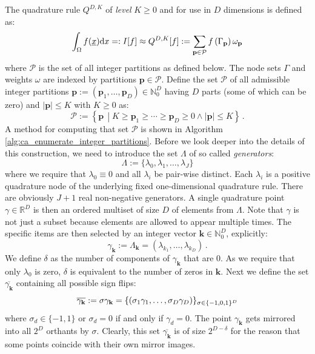 \documentclass[a4paper,10pt]{article}
\begin{document}
The quadrature rule $Q^{D,K}$ of \emph{level} $K \geq 0$ and
for use in $D$ dimensions is defined as:
\begin{equation} \label{eq:gk_basic_formula}
  \int_\Omega f(\underline{x}) \mathrm{d}x =:
  I[f] \approx Q^{D,K}[f]
       := \sum_{\mathbf{p} \in \mathcal{P}}
            f\left(\Gamma_{\mathbf{p}}\right)
            \omega_{\mathbf{p}}
\end{equation}
where $\mathcal{P}$ is the set of all integer partitions as defined below.
The node sets $\Gamma$ and weights $\omega$ are indexed by partitions
$\mathbf{p} \in \mathcal{P}$.
Define the set $\mathcal{P}$ of all admissible integer partitions
$\mathbf{p} := (\mathbf{p}_{1}, \ldots, \mathbf{p}_{D}) \in \mathbb{N}_{0}^{D}$
having $D$ parts (some of which can be zero) and $|\mathbf{p}| \leq K$
with $K \geq 0$ as:
\begin{equation} \label{eq:partition_set_def}
  \mathcal{P} :=
  \left\{
    \mathbf{p} \,
    \middle| K \geq \mathbf{p}_{1} \geq \cdots \geq \mathbf{p}_{D} \geq 0
    \wedge
    |\mathbf{p}| \leq K
  \right\}
  \,.
\end{equation}
A method for computing that set $\mathcal{P}$
is shown in Algorithm \ref{alg:ca_enumerate_integer_partitions}.
Before we look deeper into the details of this construction,
we need to introduce the set $\Lambda$ of so called \emph{generators}:
\begin{equation}
  \Lambda := \{\lambda_{0}, \lambda_{1}, \ldots, \lambda_{J}\}
\end{equation}
where we require that $\lambda_{0} \equiv 0$ and all $\lambda_{i}$ be pair-wise
distinct. Each $\lambda_{i}$ is a positive quadrature node of the underlying fixed
one-dimensional quadrature rule. There are obviously $J+1$ real non-negative generators.
A single quadrature point $\gamma \in \mathbb{R}^D$ is then an ordered
multiset of size $D$ of elements from $\Lambda$. Note that $\gamma$ is not
just a subset because elements are allowed to appear multiple times. The
specific items are then selected by an integer vector $\mathbf{k} \in \mathbb{N}_0^D$,
explicitly:
\begin{equation}
  \gamma_\mathbf{k} := \Lambda_\mathbf{k} = \left(\lambda_{k_1}, \ldots, \lambda_{k_D}\right) \,.
\end{equation}
We define $\delta$ as the number of components of $\gamma_\mathbf{k}$ that are 0.
As we require that only $\lambda_0$ is zero, $\delta$ is equivalent to the number
of zeros in $\mathbf{k}$.
Next we define the set $\overline{\gamma_\mathbf{k}}$ containing all
possible sign flips:
\begin{equation}
  \overline{\gamma_\mathbf{k}} :=
  \sigma \gamma_\mathbf{k} =
  \{
  \left(\sigma_1 \gamma_1, \ldots, \sigma_D \gamma_D\right)
  \}_{\sigma \in \{-1,0,1\}^D}
\end{equation}
where $\sigma_d \in \{-1, 1\}$ or $\sigma_d = 0$ if and only if $\gamma_d = 0$.
The point $\gamma_\mathbf{k}$ gets mirrored into all $2^D$ orthants by $\sigma$.
Clearly, this set $\overline{\gamma_\mathbf{k}}$ is of size $2^{D-\delta}$ for
the reason that some points coincide with their own mirror images.
\end{document}
